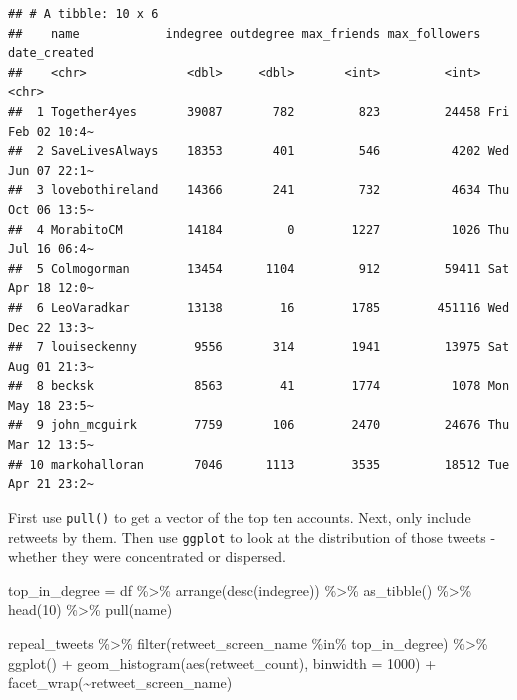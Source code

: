 \documentclass[
]{book}
\newenvironment{Shaded}{\begin{snugshade}}{\end{snugshade}}
\newcommand{\AttributeTok}[1]{\textcolor[rgb]{0.77,0.63,0.00}{#1}}
\newcommand{\DecValTok}[1]{\textcolor[rgb]{0.00,0.00,0.81}{#1}}
\newcommand{\FunctionTok}[1]{\textcolor[rgb]{0.00,0.00,0.00}{#1}}
\newcommand{\NormalTok}[1]{#1}
\newcommand{\OtherTok}[1]{\textcolor[rgb]{0.56,0.35,0.01}{#1}}
\newcommand{\SpecialCharTok}[1]{\textcolor[rgb]{0.00,0.00,0.00}{#1}}
\begin{document}
\begin{verbatim}
## # A tibble: 10 x 6
##    name            indegree outdegree max_friends max_followers date_created    
##    <chr>              <dbl>     <dbl>       <int>         <int> <chr>           
##  1 Together4yes       39087       782         823         24458 Fri Feb 02 10:4~
##  2 SaveLivesAlways    18353       401         546          4202 Wed Jun 07 22:1~
##  3 lovebothireland    14366       241         732          4634 Thu Oct 06 13:5~
##  4 MorabitoCM         14184         0        1227          1026 Thu Jul 16 06:4~
##  5 Colmogorman        13454      1104         912         59411 Sat Apr 18 12:0~
##  6 LeoVaradkar        13138        16        1785        451116 Wed Dec 22 13:3~
##  7 louiseckenny        9556       314        1941         13975 Sat Aug 01 21:3~
##  8 becksk              8563        41        1774          1078 Mon May 18 23:5~
##  9 john_mcguirk        7759       106        2470         24676 Thu Mar 12 13:5~
## 10 markohalloran       7046      1113        3535         18512 Tue Apr 21 23:2~
\end{verbatim}

First use \texttt{pull()} to get a vector of the top ten accounts. Next, only include retweets by them. Then use \texttt{ggplot} to look at the distribution of those tweets - whether they were concentrated or dispersed.

\begin{Shaded}
\begin{Highlighting}[]
\NormalTok{top\_in\_degree }\OtherTok{=}\NormalTok{ df }\SpecialCharTok{\%\textgreater{}\%} 
  \FunctionTok{arrange}\NormalTok{(}\FunctionTok{desc}\NormalTok{(indegree)) }\SpecialCharTok{\%\textgreater{}\%} 
  \FunctionTok{as\_tibble}\NormalTok{() }\SpecialCharTok{\%\textgreater{}\%} 
  \FunctionTok{head}\NormalTok{(}\DecValTok{10}\NormalTok{) }\SpecialCharTok{\%\textgreater{}\%}
  \FunctionTok{pull}\NormalTok{(name)}
\end{Highlighting}
\end{Shaded}

\begin{Shaded}
\begin{Highlighting}[]
\NormalTok{repeal\_tweets }\SpecialCharTok{\%\textgreater{}\%} 
  \FunctionTok{filter}\NormalTok{(retweet\_screen\_name }\SpecialCharTok{\%in\%}\NormalTok{ top\_in\_degree) }\SpecialCharTok{\%\textgreater{}\%} 
  \FunctionTok{ggplot}\NormalTok{() }\SpecialCharTok{+} 
  \FunctionTok{geom\_histogram}\NormalTok{(}\FunctionTok{aes}\NormalTok{(retweet\_count), }\AttributeTok{binwidth =} \DecValTok{1000}\NormalTok{) }\SpecialCharTok{+} 
  \FunctionTok{facet\_wrap}\NormalTok{(}\SpecialCharTok{\textasciitilde{}}\NormalTok{retweet\_screen\_name)}
\end{Highlighting}
\end{Shaded}
\end{document}
